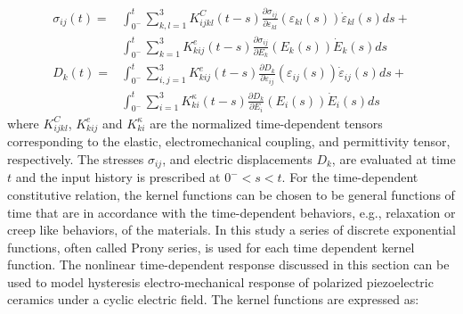 \begin{equation}
\begin{aligned}
\sigma_{ij}(t)= 
&\int_{0^-}^t 
\sum_{k,l=1}^{3} K^C_{ijkl}(t-s)\frac{\partial \sigma_{ij}}{\partial\varepsilon_{kl}}(\varepsilon_{kl}(s))\dot{\varepsilon}_{kl}(s)ds +\\
&\int_{0^-}^t 
\sum_{k=1}^{3} K^e_{kij}(t-s) \frac{\partial \sigma_{ij}}{\partial E_{k}}(E_k(s))  \dot{E}_{k} (s)ds
\\
D_k(t)=
&\int_{0^-}^t 
\sum_{i,j=1}^{3} K_{kij}^e(t-s) \frac{\partial D_{k}}{\partial \varepsilon_{ij}}(\varepsilon_{ij}(s))\dot{\varepsilon}_{ij}(s)ds + \\
&\int_{0^-}^t 
\sum_{i=1}^{3} K_{ki}^{\kappa}(t-s) \frac{\partial D_{k}}{\partial E_{i}}(E_i(s))  \dot{E}_{i} (s)ds
\end{aligned}
\label{EQN:NormalizedConstitutiveRelation}
\end{equation} 
where $K^C_{ijkl}$, $K^e_{kij}$ and $K^{\kappa}_{ki}$ are the normalized time-dependent tensors corresponding to the elastic, electromechanical coupling, and permittivity tensor, respectively. 
The stresses $\sigma_{ij}$, and electric displacements  $D_k$, are evaluated at time $t$ and the input history is prescribed at $0^-<s<t$.
For the time-dependent constitutive relation, the kernel functions can be chosen to be general functions of time that are in accordance with the time-dependent behaviors,  e.g., relaxation or creep like behaviors, of the materials. 
In this study a series of discrete exponential functions, often called Prony series, is used for each time dependent kernel function.
The nonlinear time-dependent response discussed in this section can be used to model hysteresis electro-mechanical response of polarized piezoelectric ceramics under a cyclic electric field. 
The kernel functions are expressed as: 

